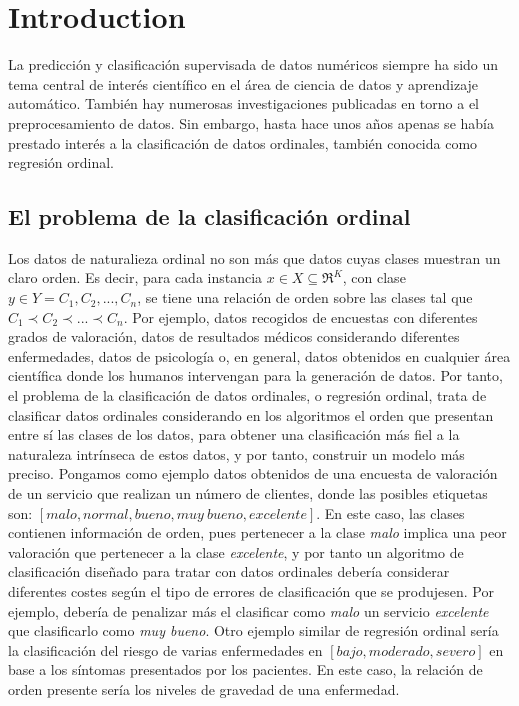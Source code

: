 \chapter{Introduction}
\label{introduction}

La predicción y clasificación supervisada de datos numéricos siempre ha sido un tema central de interés científico en el área de ciencia de datos y aprendizaje automático. También hay numerosas investigaciones publicadas en torno a el preprocesamiento de datos. Sin embargo, hasta hace unos años apenas se había prestado interés a la clasificación de datos ordinales, también conocida como regresión ordinal.

\section{El problema de la clasificación ordinal}
Los datos de naturalieza ordinal no son más que datos cuyas clases muestran un claro orden. Es decir, para cada instancia $x \in X \subseteq \Re^K $, con clase $y\in Y={C_1,C_2,...,C_n}$, se tiene una relación de orden sobre las clases tal que $C_1 \prec C_2 \prec ... \prec C_n$. Por ejemplo, datos recogidos de encuestas con diferentes grados de valoración, datos de resultados médicos considerando diferentes enfermedades, datos de psicología o, en general, datos obtenidos en cualquier área científica donde los humanos intervengan para la generación de datos. \newline
Por tanto, el problema de la clasificación de datos ordinales, o regresión ordinal, trata de clasificar datos ordinales considerando en los algoritmos el orden que presentan entre sí las clases de los datos, para obtener una clasificación más fiel a la naturaleza intrínseca de estos datos, y por tanto, construir un modelo más preciso. Pongamos como ejemplo datos obtenidos de una encuesta de valoración de un servicio que realizan un número de clientes, donde las posibles etiquetas son: \textit{$\left[malo, normal, bueno, muy\ bueno, excelente\right]$}. En este caso, las clases contienen información de orden, pues pertenecer a la clase \textit{malo} implica una peor valoración que pertenecer a la clase \textit{excelente}, y por tanto un algoritmo de clasificación diseñado para tratar con datos ordinales debería considerar diferentes costes según el tipo de errores de clasificación que se produjesen. Por ejemplo, debería de penalizar más el clasificar como \textit{malo} un servicio \textit{excelente} que clasificarlo como \textit{muy bueno}. Otro ejemplo similar de regresión ordinal sería la clasificación del riesgo de varias enfermedades en \textit{$\left[bajo, moderado, severo\right]$} en base a los síntomas presentados por los pacientes. En este caso, la relación de orden presente sería los niveles de gravedad de una enfermedad. \newline
